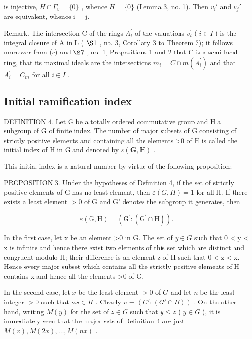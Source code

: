 is injective, \(H \cap \Gamma_{v} = \{0\}\) , whence \(H = \{0\}\) (Lemma 3, no. 1). Then \(v_{i}'\) and \(v_{j}'\) are equivalent, whence i = j.

Remark. The intersection C of the rings \(A_{i}^{\prime}\) of the valuations \(v_{i}^{\prime}\) ( \(i \in I\) ) is the integral closure of A in L ( \(\S 1\) , no. 3, Corollary 3 to Theorem 3); it follows moreover from (c) and \(\S 7\) , no. 1, Propositions 1 and 2 that C is a semi-local ring, that its maximal ideals are the intersections \(m_{i} = C \cap m(A_{i}^{\prime})\) and that \(A_{i}^{\prime} = C_{m}\) for all \(i \in I\) .

\subsection{Initial ramification index}

DEFINITION 4. Let G be a totally ordered commutative group and H a subgroup of G of finite index. The number of major subsets of G consisting of strictly positive elements and containing all the elements \textgreater0 of H is called the initial index of H in G and denoted by \(\varepsilon(\mathbf{G}, \mathbf{H})\) .

This initial index is a natural number by virtue of the following proposition:

PROPOSITION 3. Under the hypotheses of Definition 4, if the set of strictly positive elements of G has no least element, then \(\varepsilon(G, H) = 1\) for all H. If there exists a least element \(>0\) of G and G' denotes the subgroup it generates, then

\[
\varepsilon (\mathrm{G}, \mathrm{H}) = (\mathrm{G} ^ {\prime}: (\mathrm{G} ^ {\prime} \cap \mathrm{H})).
\]

In the first case, let x be an element \textgreater0 in G. The set of \(y \in G\) such that 0 \textless{} y \textless{} x is infinite and hence there exist two elements of this set which are distinct and congruent modulo H; their difference is an element z of H such that 0 \textless{} z \textless{} x. Hence every major subset which contains all the strictly positive elements of H contains x and hence all the elements \textgreater0 of G.

In the second case, let \(x\) be the least element \(>0\) of \(G\) and let \(n\) be the least integer \(>0\) such that \(nx \in H\) . Clearly \(n = (G': (G' \cap H))\) . On the other hand, writing \(M(y)\) for the set of \(z \in G\) such that \(y \leqslant z\) ( \(y \in G\) ), it is immediately seen that the major sets of Definition 4 are just \(M(x), M(2x), \ldots, M(nx)\) .

